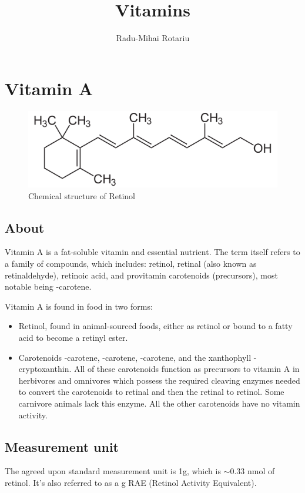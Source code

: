\documentclass{book}
\begin{document}
\title{Vitamins}
\author{Radu-Mihai Rotariu}
\maketitle
{}
\tableofcontents\newpage
{}

\chapter{Vitamin A}
\begin{figure}[h]
	\caption{Chemical structure of Retinol}
	\centering \includegraphics[width=\textwidth]{images/Vitamin_A_chemical_structure}
\end{figure}
\newpage

\section{About}
Vitamin A is a fat-soluble vitamin and essential nutrient. The term itself refers to a family of compounds, which includes: retinol, retinal (also known as retinaldehyde), retinoic acid, and provitamin carotenoids (precursors), most notable being \textbeta-carotene.

Vitamin A is found in food in two forms:
\begin{itemize}
	\item Retinol, found in animal-sourced foods, either as retinol or bound to a fatty acid to become a retinyl ester.
	\item Carotenoids \textalpha-carotene, \textbeta-carotene, \textgamma-carotene, and the xanthophyll \textbeta-cryptoxanthin. All of these carotenoids function as precursors to vitamin A in herbivores and omnivores which possess the required cleaving enzymes needed to convert the carotenoids to retinal and then the retinal to retinol. Some carnivore animals lack this enzyme. All the other carotenoids have no vitamin activity.
\end{itemize}

\section{Measurement unit}
The agreed upon standard measurement unit is 1\textmu g, which is $\sim$0.33 nmol of retinol. It's also referred to as a \textmu g RAE (Retinol Activity Equivalent).
\end{document}
